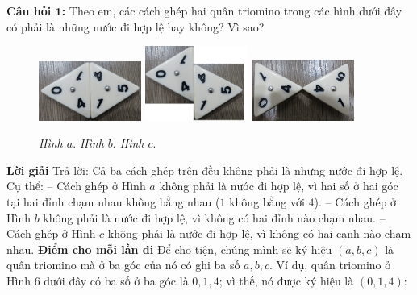 	\vspace*{-5pt}
	{\bf Câu hỏi $\pmb{1}$:}  %
	\vskip 0.1cm
	Theo em, các cách ghép hai quân triomino trong các hình dưới đây có phải là những nước đi hợp lệ hay không? Vì sao?
	\begin{figure}[H]
		\centering
		\vspace*{-5pt}
		\captionsetup{labelformat=empty, justification=centering}
		\includegraphics[width=0.3\textwidth]{dom-10a}\quad
		\includegraphics[width=0.3\textwidth]{dom-10b}\quad
		\includegraphics[width=0.3\textwidth]{dom-10c}
		\caption{\textit{\small Hình $a.$ \hspace{70pt}Hình $b.$ \hspace{70pt}Hình $c.$ }}
		\vspace*{-5pt}
	\end{figure}
	{\bf Lời giải}   %
	\vskip 0.1cm
	Trả lời: Cả ba cách ghép trên đều không phải là những nước đi hợp lệ. Cụ thể:
	\vskip 0.1cm
	-- Cách ghép ở Hình $a$ không phải là nước đi hợp lệ, vì hai số ở hai góc tại hai đỉnh chạm nhau không bằng nhau ($1$ không bằng với $4$).
	\vskip 0.1cm
	-- Cách ghép ở Hình $b$ không phải là nước đi hợp lệ, vì không có hai đỉnh nào chạm nhau.
	\vskip 0.1cm
	-- Cách ghép ở Hình $c$ không phải là nước đi hợp lệ, vì không có hai cạnh nào chạm nhau.
	\vskip 0.1cm
	{\bf {Điểm cho mỗi lần đi}}   %
	\vskip 0.1cm
	Để cho tiện, chúng mình sẽ ký hiệu $(a, b, c)$ là quân triomino mà ở ba góc của nó có ghi ba số $a, b, c$. Ví dụ, quân triomino ở Hình $6$ dưới đây có ba số ở ba góc là $0, 1, 4$; vì thế, nó được ký hiệu là $(0, 1, 4)$:
